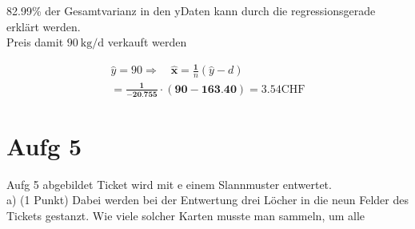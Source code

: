 \documentclass[10pt]{article}
\begin{document}
{82.99\% der Gesamtvarianz in den yDaten kann durch die regressionsgerade erklärt werden.\\
Preis damit $90 \mathrm{~kg} / \mathrm{d}$ verkauft werden

$$
\begin{gathered}
\hat{y}=90 \Rightarrow \quad \hat{\boldsymbol{x}}=\frac{\mathbf{1}}{n}(\widehat{y}-d) \\
=\frac{\mathbf{1}}{-\mathbf{2 0 . 7 5 5}} \cdot(\mathbf{9 0}-\mathbf{1 6 3 . 4 0})=3.54 \mathrm{CHF}
\end{gathered}
$$

\section*{Aufg 5}
Aufg 5 abgebildet Ticket wird mit e einem Slannmuster entwertet.\\
a) (1 Punkt) Dabei werden bei der Entwertung drei Löcher in die neun Felder des\\
Tickets gestanzt. Wie viele solcher Karten musste man sammeln, um alle

}
\end{document}
